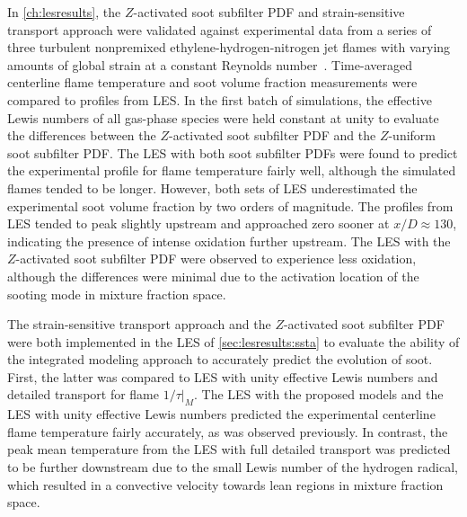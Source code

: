 In \cref{ch:lesresults}, the $Z$-activated soot subfilter PDF and strain-sensitive transport approach were validated against experimental data from a series of three turbulent nonpremixed ethylene-hydrogen-nitrogen jet flames with varying amounts of global strain at a constant Reynolds number~\cite{mahmoud2017}. Time-averaged centerline flame temperature and soot volume fraction measurements were compared to profiles from LES. In the first batch of simulations, the effective Lewis numbers of all gas-phase species were held constant at unity to evaluate the differences between the $Z$-activated soot subfilter PDF and the $Z$-uniform soot subfilter PDF. The LES with both soot subfilter PDFs were found to predict the experimental profile for flame temperature fairly well, although the simulated flames tended to be longer. However, both sets of LES underestimated the experimental soot volume fraction by two orders of magnitude. The profiles from LES tended to peak slightly upstream and approached zero sooner at $x/D \approx 130$, indicating the presence of intense oxidation further upstream. The LES with the $Z$-activated soot subfilter PDF were observed to experience less oxidation, although the differences were minimal due to the activation location of the sooting mode in mixture fraction space.

The strain-sensitive transport approach and the $Z$-activated soot subfilter PDF were both implemented in the LES of \cref{sec:lesresults:ssta} to evaluate the ability of the integrated modeling approach to accurately predict the evolution of soot. First, the latter was compared to LES with unity effective Lewis numbers and detailed transport for flame $1/\tau|_M$. The LES with the proposed models and the LES with unity effective Lewis numbers predicted the experimental centerline flame temperature fairly accurately, as was observed previously. In contrast, the peak mean temperature from the LES with full detailed transport was predicted to be further downstream due to the small Lewis number of the hydrogen radical, which resulted in a convective velocity towards lean regions in mixture fraction space.

